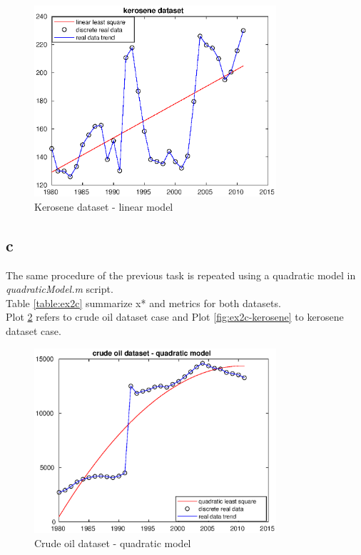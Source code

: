 \documentclass[unicode,11pt,a4paper,oneside,numbers=endperiod,openany]{scrartcl}
\begin{document}
\begin{figure}[H]
    \centering
    \caption{Kerosene dataset - linear model}
    \label{fig:ex2-kerosene}
    \includegraphics[width=0.8\textwidth]{ex2-kerosene.eps}
\end{figure}

\subsection*{c}
The same procedure of the previous task is repeated using a quadratic model in \textit{quadraticModel.m} script. \\
Table \ref{table:ex2c} summarize x* and metrics for both datasets. \\
Plot \ref{fig:ex2c-oil} refers to crude oil dataset case and Plot \ref{fig:ex2c-kerosene} to kerosene dataset case.

\begin{figure}[H]
    \centering
    \caption{Crude oil dataset - quadratic model}
    \label{fig:ex2c-oil}
    \includegraphics[width=0.8\textwidth]{ex2c-oil.eps}
\end{figure}
\end{document}
